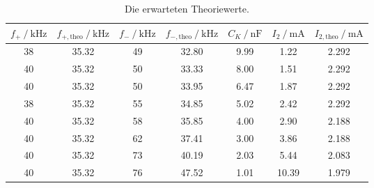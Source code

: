 \begin{table}
  \centering
  \caption{Die erwarteten Theoriewerte.}
  \label{tab:theorietabelle}
  \begin{tabular}{c c c c c c c}
      \toprule
      $f_+ \:/\: \si{\kilo\hertz}$ & $f_{+, \text{theo}} \:/\: \si{\kilo\hertz}$ & $f_- \:/\: \si{\kilo\hertz}$ & $f_{-, \text{theo}} \:/\: \si{\kilo\hertz}$ & $C_K \:/\: \si{\nano\farad}$ & $I_2 \:/\: \si{\milli\ampere}$ & $I_{2,\text{theo}} \:/\: \si{\milli\ampere}$ \\
      \midrule
      38 & 35.32 & 49 & 32.80 & 9.99 & 1.22 & 2.292 \\
      40 & 35.32 & 50 & 33.33 & 8.00 & 1.51 & 2.292 \\
      40 & 35.32 & 50 & 33.95 & 6.47 & 1.87 & 2.292 \\
      38 & 35.32 & 55 & 34.85 & 5.02 & 2.42 & 2.292 \\
      40 & 35.32 & 58 & 35.85 & 4.00 & 2.90 & 2.188 \\
      40 & 35.32 & 62 & 37.41 & 3.00 & 3.86 & 2.188 \\
      40 & 35.32 & 73 & 40.19 & 2.03 & 5.44 & 2.083 \\
      40 & 35.32 & 76 & 47.52 & 1.01 & 10.39 & 1.979 \\
      \bottomrule
  \end{tabular}
\end{table}

\pagebreak